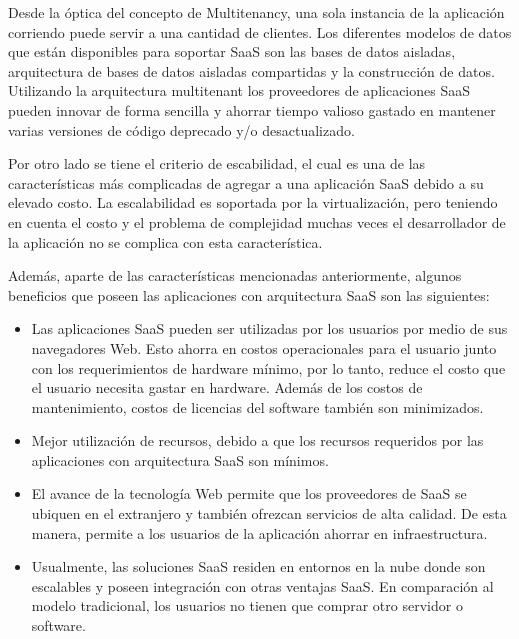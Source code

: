 Desde la óptica del concepto de Multitenancy, una sola instancia de la aplicación corriendo puede servir a una cantidad de clientes. Los diferentes modelos de datos que están disponibles para soportar SaaS son las bases de datos aisladas, arquitectura de bases de datos aisladas compartidas y la construcción de datos\citep{lee2012web}. Utilizando la arquitectura multitenant los proveedores de aplicaciones SaaS pueden innovar de forma sencilla y ahorrar tiempo valioso gastado en mantener varias versiones de código deprecado y/o desactualizado\citep{kang2011design}.

Por otro lado se tiene el criterio de escabilidad, el cual es una de las características más complicadas de agregar a una aplicación SaaS debido a su elevado costo. La escalabilidad es soportada por la virtualización, pero teniendo en cuenta el costo y el problema de complejidad muchas veces el desarrollador de la aplicación no se complica con esta característica\citep{li2012cooperative}.

Además, aparte de las características mencionadas anteriormente, algunos beneficios que poseen las aplicaciones con arquitectura SaaS son las siguientes: \citep{li2012cooperative}\citep{ma2007business}\citep{chou2008software} 
\begin{itemize}
	\item Las aplicaciones SaaS pueden ser utilizadas por los usuarios por medio de sus navegadores Web. Esto ahorra en costos operacionales para el usuario junto con los requerimientos de hardware mínimo, por lo tanto, reduce el costo que el usuario necesita gastar en hardware.  Además de los costos de mantenimiento, costos de licencias del software también son minimizados.
	\item Mejor utilización de recursos, debido a que los recursos requeridos por las aplicaciones con arquitectura SaaS son mínimos.
	\item El avance de la tecnología Web permite que los proveedores de SaaS se ubiquen en el extranjero y también ofrezcan servicios de alta calidad. De esta manera, permite a los usuarios de la aplicación ahorrar en infraestructura.
	\item Usualmente, las soluciones SaaS residen en entornos en la nube donde son escalables y poseen integración con otras ventajas SaaS. En comparación al modelo tradicional, los usuarios no tienen que comprar otro servidor o software.
\end{itemize}